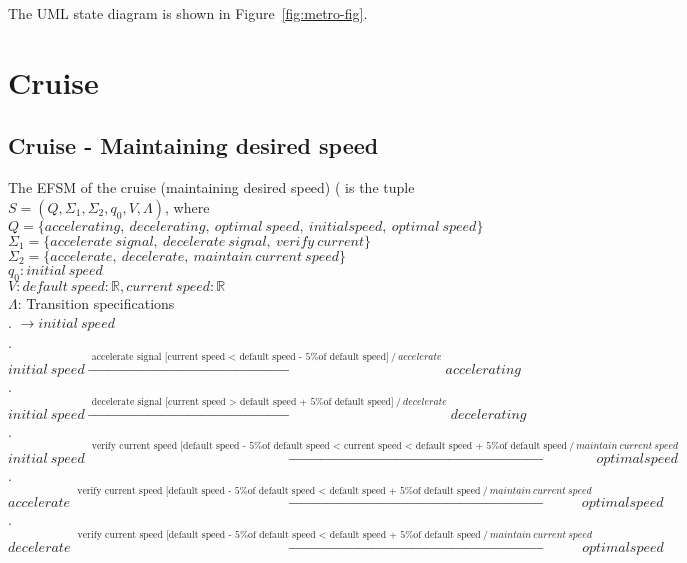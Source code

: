 \documentclass[12pt]{article}
\begin{document}
\begin{spacing}{1.5}
\noindent The UML state diagram is shown in Figure~\ref{fig:metro-fig}.

\newpage

\section{Cruise}
\subsection{Cruise - Maintaining desired speed}

\noindent The EFSM of the cruise (maintaining desired speed) ( is the tuple $S = (Q, \Sigma_1, \Sigma_2, q_0, V, \Lambda)$, where\\

\noindent $Q = \{accelerating,~decelerating,~optimal~speed,~initial speed,~optimal~speed\}$\\
\noindent $\Sigma_1 = \{accelerate~signal,~decelerate~signal,~ verify~current\}$\\
\noindent $\Sigma_2 = \{accelerate,~decelerate,~maintain~current~speed\}$\\
\noindent $q_0: initial~speed$\\
\noindent $V: default~speed: \mathbb R, current~speed: \mathbb R$\\
\noindent $\Lambda$: Transition specifications\\
. $\rightarrow initial~speed$\\
. $initial~speed \xrightarrow {\text { accelerate signal [current speed < default speed - 5\% of default speed]}~/ ~accelerate} accelerating$\\
. $initial~speed \xrightarrow {\text { decelerate signal [current speed > default speed + 5\% of default speed]}~/ ~decelerate} decelerating$\\
. $initial~speed \xrightarrow {\text { verify current speed [default speed - 5\% of default speed < current speed < default speed + 5\% of default speed}~/~maintain~current~speed} optimal speed$\\
. $accelerate \xrightarrow {\text { verify current speed [default speed - 5\% of default speed < default speed + 5\% of default speed}~/~maintain~current~speed} optimal speed$\\
. $decelerate \xrightarrow {\text { verify current speed [default speed - 5\% of default speed < default speed + 5\% of default speed}~/~maintain~current~speed} optimal speed$\\



\end{spacing}
\end{document}
